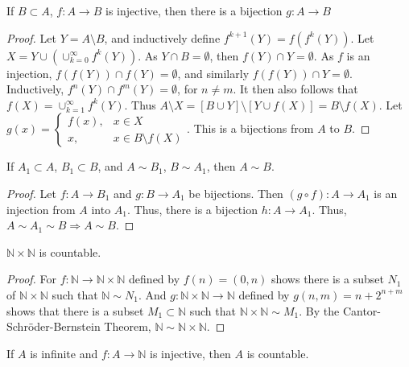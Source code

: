     \begin{theorem}
        If $B\subset A$, $f:A\rightarrow B$ is injective, then there
        is a bijection $g:A\rightarrow B$
    \end{theorem}
    \begin{proof}
        Let $Y = A\setminus B$, and inductively define
        $f^{k+1}(Y)=f(f^{k}(Y))$. Let
        $X=Y\cup(\cup_{k=0}^{\infty}f^{k}(Y))$. As  $Y\cap{B}=\emptyset$,
        then $f(Y)\cap Y= \emptyset$. As $f$ is an injection,
        $f(f(Y))\cap f(Y)=\emptyset$,
        and similarly $f(f(Y))\cap Y = \emptyset$. Inductively,
        $f^{n}(Y)\cap f^{m}(Y)=\emptyset$,
    for $n\ne m$. It then also follows that $f(X) = \cup_{k=1}^{\infty} f^{k}(Y)$.
    Thus $A\setminus X = [B\cup Y]\setminus [Y\cup f(X)] = B\setminus f(X)$.
    Let $g(x) = \begin{cases} f(x), & x\in X \\ x, & x \in B\setminus f(X)\end{cases}$.
    This is a bijections from $A$ to $B$.
    \end{proof}
    \begin{theorem}
    If $A_1 \subset A$, $B_1 \subset B$, and $A\sim B_1$, $B \sim A_1$, then $A\sim B$.
    \end{theorem}
    \begin{proof}
    Let $f:A\rightarrow B_1$ and $g:B\rightarrow A_1$ be bijections.
    Then $(g\circ f):A\rightarrow A_1$ is an injection from $A$ into $A_1$.
    Thus, there is a bijection $h:A\rightarrow A_1$. Thus, $A\sim A_1 \sim B\Rightarrow A\sim B$.
    \end{proof}
    \begin{theorem}
        $\mathbb{N}\times \mathbb{N}$ is countable.
    \end{theorem}
    \begin{proof}
    For $f:\mathbb{N} \rightarrow \mathbb{N}\times \mathbb{N}$ defined by $f(n) = (0,n)$
    shows there is a subset $N_1$ of $\mathbb{N} \times \mathbb{N}$ such that
    $\mathbb{N}\sim N_1$. And $g:\mathbb{N}\times \mathbb{N} \rightarrow \mathbb{N}$
    defined by $g(n,m) =n+2^{n+m}$ shows that there is a subset $M_1 \subset \mathbb{N}$
    such that $\mathbb{N} \times \mathbb{N} \sim M_1$. By the Cantor-Schr\"{o}der-Bernstein Theorem,
    $\mathbb{N} \sim \mathbb{N}\times \mathbb{N}$.
    \end{proof}
    \begin{theorem}
        If $A$ is infinite and $f:A\rightarrow\mathbb{N}$ is injective,
        then $A$ is countable.
    \end{theorem}
